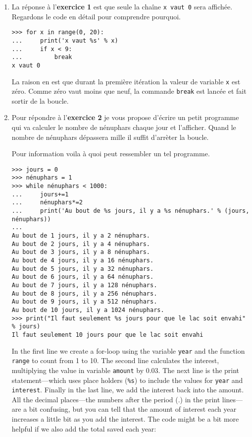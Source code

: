 \begin{enumerate}
\item La réponse à l'\textbf{exercice 1} est que seule la chaîne \texttt{x vaut 0} sera affichée. Regardons le code en détail pour comprendre pourquoi.
\begin{Verbatim}[frame=single,rulecolor=\color{gray}, label=ne pas taper]
>>> for x in range(0, 20):
... 	print('x vaut %s' % x)
... 	if x < 9:
... 		break
x vaut 0
\end{Verbatim}

La raison en est que durant la première itération la valeur de variable \texttt{x} est zéro. Comme zéro vaut moins que neuf, la commande \texttt{break} est lancée et fait sortir de la boucle.

\item Pour répondre à l'\textbf{exercice 2} je vous propose d'écrire un petit programme qui va calculer le nombre de nénuphars chaque jour et l'afficher. Quand le nombre de nénuphars dépassera mille il suffit d'arrèter la boucle.

Pour information voila à quoi peut ressembler un tel programme.
\begin{Verbatim}[frame=single,rulecolor=\color{gray}, label=ne pas taper]
>>> jours = 0
>>> nénuphars = 1
>>> while nénuphars < 1000:
...     jours+=1
...     nénuphars*=2 
...     print('Au bout de %s jours, il y a %s nénuphars.' % (jours, nénuphars))
... 
Au bout de 1 jours, il y a 2 nénuphars.
Au bout de 2 jours, il y a 4 nénuphars.
Au bout de 3 jours, il y a 8 nénuphars.
Au bout de 4 jours, il y a 16 nénuphars.
Au bout de 5 jours, il y a 32 nénuphars.
Au bout de 6 jours, il y a 64 nénuphars.
Au bout de 7 jours, il y a 128 nénuphars.
Au bout de 8 jours, il y a 256 nénuphars.
Au bout de 9 jours, il y a 512 nénuphars.
Au bout de 10 jours, il y a 1024 nénuphars.
>>> print("Il faut seulement %s jours pour que le lac soit envahi" % jours)
Il faut seulement 10 jours pour que le lac soit envahi
\end{Verbatim}



In the first line we create a for-loop using the variable \texttt{year} and the function \texttt{range} to count from 1 to 10.  The second line calculates the interest, multiplying the value in variable \texttt{amount} by 0.03.  The next line is the print statement---which uses place holders (\texttt{\%s}) to include the values for \texttt{year} and \texttt{interest}.  Finally in the last line, we add the interest back into the amount.
All the decimal places---the numbers after the period (.) in the print lines---are a bit confusing, but you can tell that the amount of interest each year increases a little bit as you add the interest.
The code might be a bit more helpful if we also add the total saved each year:

\end{enumerate}

